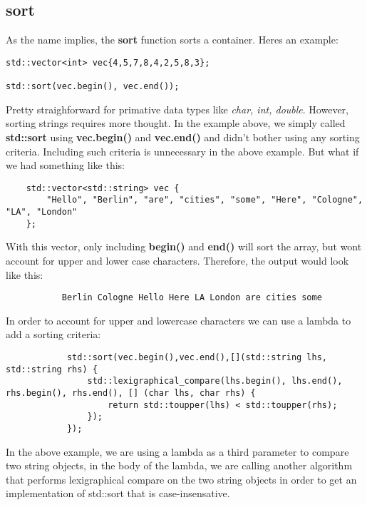 \documentclass{report}
\begin{document}
\subsection{sort}
As the name implies, the \textbf{sort} function sorts a container. Heres an example:
\begin{verbatim}
std::vector<int> vec{4,5,7,8,4,2,5,8,3};

std::sort(vec.begin(), vec.end());
\end{verbatim}
    Pretty straighforward for primative data types like \textit{char, int, double}. However, sorting strings requires more thought. In the example above, we simply called \textbf{std::sort} using \textbf{vec.begin()} and \textbf{vec.end()} and didn't bother using any sorting criteria. Including such criteria is unnecessary in the above example. But what if we had something like this:
    \begin{verbatim}
    std::vector<std::string> vec {
        "Hello", "Berlin", "are", "cities", "some", "Here", "Cologne", "LA", "London"
    };
    \end{verbatim}
        With this vector, only including \textbf{begin()} and \textbf{end()} will sort the array, but wont account for upper and lower case characters. Therefore, the output would look like this:
        \begin{verbatim}
           Berlin Cologne Hello Here LA London are cities some
        \end{verbatim}
            In order to account for upper and lowercase characters we can use a lambda to add a sorting criteria:
            \begin{verbatim}
            std::sort(vec.begin(),vec.end(),[](std::string lhs, std::string rhs) {
                std::lexigraphical_compare(lhs.begin(), lhs.end(), rhs.begin(), rhs.end(), [] (char lhs, char rhs) {
                    return std::toupper(lhs) < std::toupper(rhs);
                });
            });
            \end{verbatim}
                In the above example, we are using a lambda as a third parameter to compare two string objects, in the body of the lambda, we are calling another algorithm that performs lexigraphical compare on the two string objects in order to get an implementation of std::sort that is case-insensative.
\end{document}
